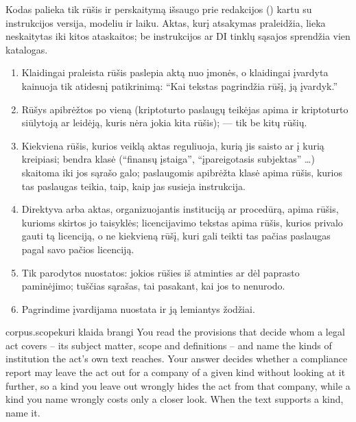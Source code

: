 Kodas palieka tik  rūšis ir perskaitymą išsaugo prie redakcijos
() kartu su instrukcijos versija, modeliu ir laiku. Aktas,
kurį atsakymas praleidžia, lieka neskaitytas iki kitos ataskaitos; be instrukcijos ar DI tinklų
sąsajos sprendžia vien katalogas.

\begin{enumerate}[itemsep=1pt, topsep=3pt]
  \item Klaidingai praleista rūšis paslepia aktą nuo įmonės, o klaidingai įvardyta kainuoja tik
    atidesnį patikrinimą: \enquote{Kai tekstas pagrindžia rūšį, ją įvardyk.}
  \item Rūšys apibrėžtos po vieną (kriptoturto paslaugų teikėjas apima ir kriptoturto
    siūlytoją ar leidėją, kuris nėra jokia kita rūšis);  --- tik be kitų rūšių.
  \item Kiekviena rūšis, kurios veiklą aktas reguliuoja, kurią jis saisto ar į kurią kreipiasi;
    bendra klasė (\enquote{finansų įstaiga}, \enquote{įpareigotasis subjektas} …) skaitoma iki
    jos sąrašo galo; paslaugomis apibrėžta klasė apima rūšis, kurios tas paslaugas teikia, taip,
    kaip jas susieja instrukcija.
  \item Direktyva arba aktas, organizuojantis instituciją ar procedūrą, apima rūšis, kurioms
    skirtos jo taisyklės; licencijavimo tekstas apima rūšis, kurios privalo gauti tą licenciją, o ne
    kiekvieną rūšį, kuri gali teikti tas pačias paslaugas pagal savo pačios licenciją.
  \item Tik parodytos nuostatos: jokios rūšies iš atminties ar dėl paprasto paminėjimo; tuščias
    sąrašas, tai pasakant, kai jos to nenurodo.
  \item Pagrindime įvardijama nuostata ir ją lemiantys žodžiai.
\end{enumerate}

\par\nopagebreak
\begin{promptexcerpt}{corpus.scope}{kuri klaida brangi}
You read the provisions that decide whom a legal act covers – its subject matter, scope and definitions – and name the kinds of institution the act's own text reaches. Your answer decides whether a compliance report may leave the act out for a company of a given kind without looking at it further, so a kind you leave out wrongly hides the act from that company, while a kind you name wrongly costs only a closer look. When the text supports a kind, name it.
\end{promptexcerpt}


